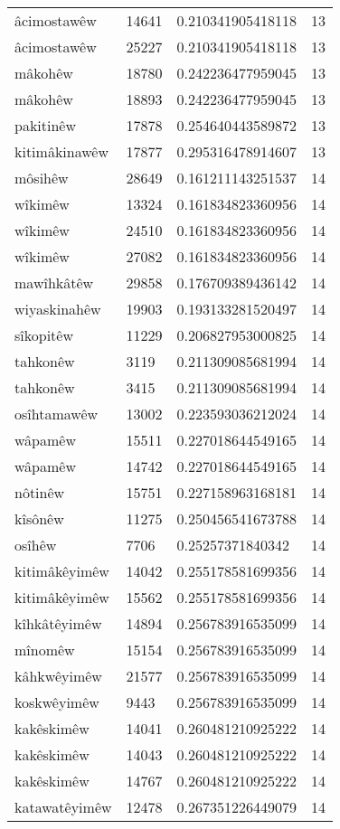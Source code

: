 \begin{longtable}{llll}
âcimostawêw & 14641 & 0.210341905418118 & 13\\
âcimostawêw & 25227 & 0.210341905418118 & 13\\
mâkohêw & 18780 & 0.242236477959045 & 13\\
mâkohêw & 18893 & 0.242236477959045 & 13\\
pakitinêw & 17878 & 0.254640443589872 & 13\\
kitimâkinawêw & 17877 & 0.295316478914607 & 13\\
môsihêw & 28649 & 0.161211143251537 & 14\\
wîkimêw & 13324 & 0.161834823360956 & 14\\
wîkimêw & 24510 & 0.161834823360956 & 14\\
wîkimêw & 27082 & 0.161834823360956 & 14\\
mawîhkâtêw & 29858 & 0.176709389436142 & 14\\
wiyaskinahêw & 19903 & 0.193133281520497 & 14\\
sîkopitêw & 11229 & 0.206827953000825 & 14\\
tahkonêw & 3119 & 0.211309085681994 & 14\\
tahkonêw & 3415 & 0.211309085681994 & 14\\
osîhtamawêw & 13002 & 0.223593036212024 & 14\\
wâpamêw & 15511 & 0.227018644549165 & 14\\
wâpamêw & 14742 & 0.227018644549165 & 14\\
nôtinêw & 15751 & 0.227158963168181 & 14\\
kîsônêw & 11275 & 0.250456541673788 & 14\\
osîhêw & 7706 & 0.25257371840342 & 14\\
kitimâkêyimêw & 14042 & 0.255178581699356 & 14\\
kitimâkêyimêw & 15562 & 0.255178581699356 & 14\\
kîhkâtêyimêw & 14894 & 0.256783916535099 & 14\\
mînomêw & 15154 & 0.256783916535099 & 14\\
kâhkwêyimêw & 21577 & 0.256783916535099 & 14\\
koskwêyimêw & 9443 & 0.256783916535099 & 14\\
kakêskimêw & 14041 & 0.260481210925222 & 14\\
kakêskimêw & 14043 & 0.260481210925222 & 14\\
kakêskimêw & 14767 & 0.260481210925222 & 14\\
katawatêyimêw & 12478 & 0.267351226449079 & 14\\

\end{longtable}

